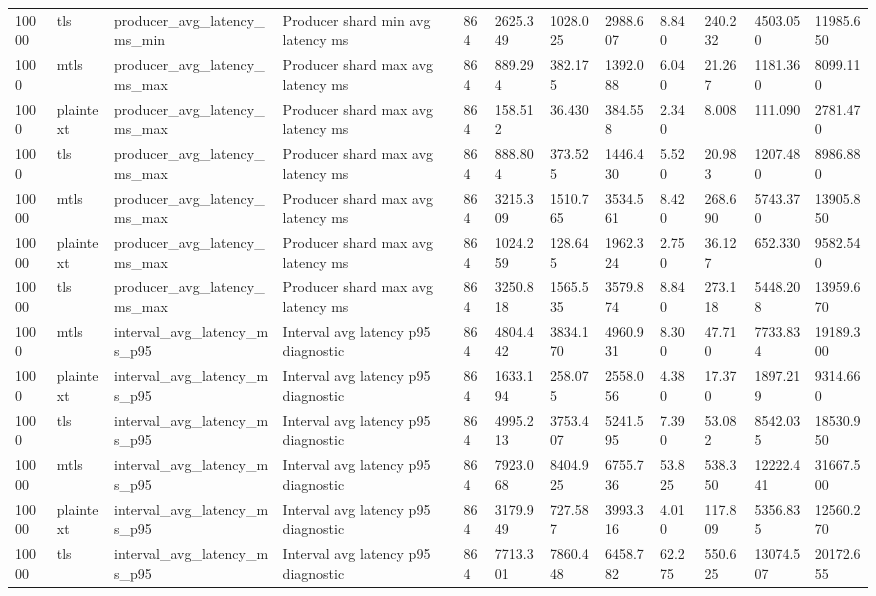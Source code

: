 \begin{longtable}{llllllllllll}
10000 & tls & producer\_avg\_latency\_ms\_min & Producer shard min avg latency ms & 864 & 2625.349 & 1028.025 & 2988.607 & 8.840 & 240.232 & 4503.050 & 11985.650 \\
1000 & mtls & producer\_avg\_latency\_ms\_max & Producer shard max avg latency ms & 864 & 889.294 & 382.175 & 1392.088 & 6.040 & 21.267 & 1181.360 & 8099.110 \\
1000 & plaintext & producer\_avg\_latency\_ms\_max & Producer shard max avg latency ms & 864 & 158.512 & 36.430 & 384.558 & 2.340 & 8.008 & 111.090 & 2781.470 \\
1000 & tls & producer\_avg\_latency\_ms\_max & Producer shard max avg latency ms & 864 & 888.804 & 373.525 & 1446.430 & 5.520 & 20.983 & 1207.480 & 8986.880 \\
10000 & mtls & producer\_avg\_latency\_ms\_max & Producer shard max avg latency ms & 864 & 3215.309 & 1510.765 & 3534.561 & 8.420 & 268.690 & 5743.370 & 13905.850 \\
10000 & plaintext & producer\_avg\_latency\_ms\_max & Producer shard max avg latency ms & 864 & 1024.259 & 128.645 & 1962.324 & 2.750 & 36.127 & 652.330 & 9582.540 \\
10000 & tls & producer\_avg\_latency\_ms\_max & Producer shard max avg latency ms & 864 & 3250.818 & 1565.535 & 3579.874 & 8.840 & 273.118 & 5448.208 & 13959.670 \\
1000 & mtls & interval\_avg\_latency\_ms\_p95 & Interval avg latency p95 diagnostic & 864 & 4804.442 & 3834.170 & 4960.931 & 8.300 & 47.710 & 7733.834 & 19189.300 \\
1000 & plaintext & interval\_avg\_latency\_ms\_p95 & Interval avg latency p95 diagnostic & 864 & 1633.194 & 258.075 & 2558.056 & 4.380 & 17.370 & 1897.219 & 9314.660 \\
1000 & tls & interval\_avg\_latency\_ms\_p95 & Interval avg latency p95 diagnostic & 864 & 4995.213 & 3753.407 & 5241.595 & 7.390 & 53.082 & 8542.035 & 18530.950 \\
10000 & mtls & interval\_avg\_latency\_ms\_p95 & Interval avg latency p95 diagnostic & 864 & 7923.068 & 8404.925 & 6755.736 & 53.825 & 538.350 & 12222.441 & 31667.500 \\
10000 & plaintext & interval\_avg\_latency\_ms\_p95 & Interval avg latency p95 diagnostic & 864 & 3179.949 & 727.587 & 3993.316 & 4.010 & 117.809 & 5356.835 & 12560.270 \\
10000 & tls & interval\_avg\_latency\_ms\_p95 & Interval avg latency p95 diagnostic & 864 & 7713.301 & 7860.448 & 6458.782 & 62.275 & 550.625 & 13074.507 & 20172.655 \\

\end{longtable}
